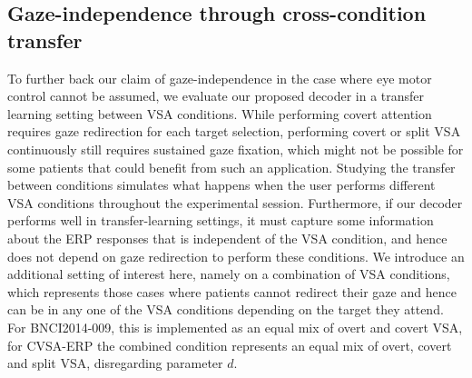 \subsection{Gaze-independence through cross-condition transfer}
\label{sec:cross_results}
To further back our claim of gaze-independence in the case where eye motor
control cannot be assumed, we evaluate our proposed decoder in a transfer
learning setting between VSA conditions.
While performing covert attention requires gaze redirection for each target
selection, performing covert or split VSA continuously still requires
sustained gaze fixation, which might not be possible for some patients that
could benefit from such an application.
Studying the transfer between conditions simulates what happens
when the user performs different VSA conditions throughout the
experimental session.
Furthermore, if our decoder performs well in transfer-learning settings,
it must capture some information about the ERP responses that is independent of
the VSA condition, and hence does not depend on gaze redirection to perform
these conditions.
We introduce an additional setting of interest here, namely on a combination of VSA
conditions, which represents those cases where patients cannot
redirect their gaze and hence can be in any one of the VSA conditions depending on the
target they attend.
For BNCI2014-009, this is implemented as an equal mix of overt and
covert VSA, for CVSA-ERP the combined condition represents an equal mix of overt,
covert and split VSA, disregarding parameter $d$.

